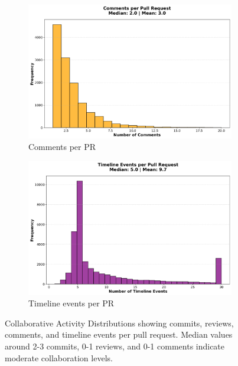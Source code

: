 \documentclass[11pt]{article}
\begin{document}
\begin{figure}[H]
\begin{subfigure}[b]{0.48\textwidth}
\centering
\includegraphics[width=\textwidth]{figures_individual/16_comments_per_pr_histogram.png}
\caption{Comments per PR}
\label{fig:comments}
\end{subfigure}
\hfill
\begin{subfigure}[b]{0.48\textwidth}
\centering
\includegraphics[width=\textwidth]{figures_individual/18_timeline_events_per_pr_histogram.png}
\caption{Timeline events per PR}
\label{fig:timeline}
\end{subfigure}

\caption{Collaborative Activity Distributions showing commits, reviews, comments, and timeline events per pull request. Median values around 2-3 commits, 0-1 reviews, and 0-1 comments indicate moderate collaboration levels.}
\label{fig:commit_review_all}
\end{figure}
\end{document}
